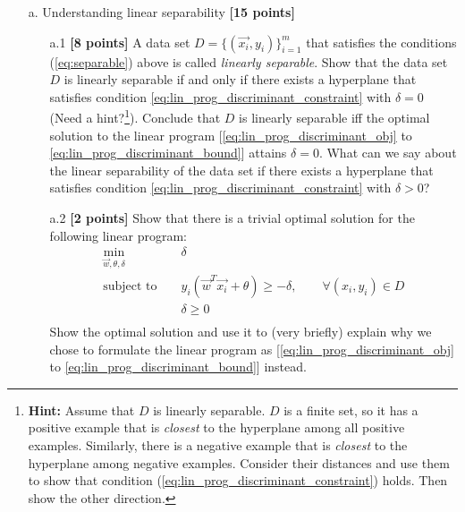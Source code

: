 \begin{enumerate}
\begin{enumerate}
\item[a.] Understanding linear separability {\bf [15 points]} 
  \begin{enumerate}
  \item [a.1] \textbf{[8 points]} A data set
      $D=\{(\vec{x_i},y_i)\}_{i=1}^m$ that satisfies the 
      conditions (\ref{eq:separable}) above is called
      {\em linearly separable}. 
      Show that the data set
      $D$ is linearly separable 
      if and only if there exists
      a hyperplane that satisfies 
      condition
      \eqref{eq:lin_prog_discriminant_constraint} with $\delta = 0$ 
	  (Need a hint?\footnote{{\bf Hint:} Assume that $D$ is linearly separable. $D$ is a
      finite set, so it has a positive example that is {\em closest}
      to the hyperplane among all positive examples. Similarly, there
      is a negative example that is {\em closest} to the hyperplane
      among negative examples. Consider their distances and use them
      to show that condition
      (\ref{eq:lin_prog_discriminant_constraint}) holds. Then show the
      other direction.
	  }).
      Conclude that $D$ is linearly separable iff the optimal solution
      to the linear program
      [\eqref{eq:lin_prog_discriminant_obj} to \eqref{eq:lin_prog_discriminant_bound}]
      attains $\delta = 0$.
      What can we say about the linear separability of the data set
      if there exists a hyperplane that satisfies condition
      \eqref{eq:lin_prog_discriminant_constraint} with $\delta > 0$?

  \item [a.2] \textbf{[2 points]} Show that there is a
      trivial optimal solution for the following linear
      program:
    \begin{eqnarray*}
\min_{\vec{w}, \theta, \delta} & & \delta  \\
      \textrm{subject to } & & y_i(\vec{w}^T \vec{x_i} + \theta) \geq - \delta, \qquad \forall (x_i,y_i) \in D \\
      && \delta \geq 0  \\
    \end{eqnarray*}
	Show the optimal solution and use it to (very briefly)
	explain why we chose to formulate the linear program as
	[\eqref{eq:lin_prog_discriminant_obj} to \eqref{eq:lin_prog_discriminant_bound}]
	instead.


\end{enumerate}
\end{enumerate}
\end{enumerate}
